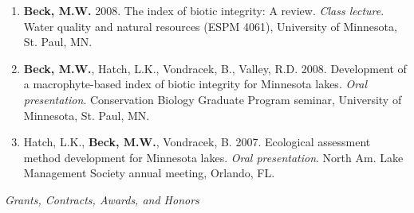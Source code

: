 \documentclass[letterpaper,12pt]{article}
\newcommand{\sectitle}[1]{\vspace{\baselineskip} \centerline{\large{\textit{#1}}}}
\begin{document}
\begin{enumerate}
\item {\bf Beck, M.W.} 2008. The index of biotic integrity: A review. \textit{Class lecture}. Water quality and natural resources (ESPM 4061), University of Minnesota, St. Paul, MN.

\item {\bf Beck, M.W.}, Hatch, L.K., Vondracek, B., Valley, R.D. 2008. Development of a macrophyte-based index of biotic integrity for Minnesota lakes. \textit{Oral presentation}. Conservation Biology Graduate Program seminar, University of Minnesota, St. Paul, MN.

\item Hatch, L.K., {\bf Beck, M.W.}, Vondracek, B. 2007. Ecological assessment method development for Minnesota lakes. \textit{Oral presentation}. North Am. Lake Management Society annual meeting, Orlando, FL.

\end{enumerate}

\sectitle{Grants, Contracts, Awards, and Honors}
\end{document}

